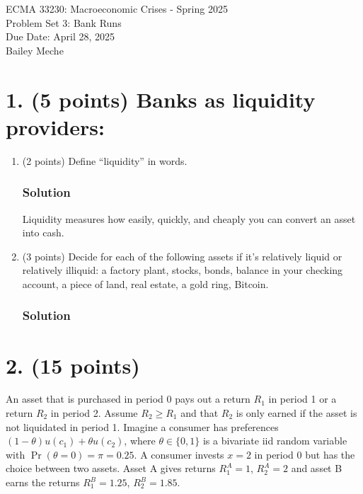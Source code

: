 \documentclass[12pt]{article}
\begin{document}
	\begin{center}
		ECMA 33230: Macroeconomic Crises - Spring 2025\\
        Problem Set 3: Bank Runs \\
		Due Date: April 28, 2025 \\
        Bailey Meche
	\end{center}

\section*{1. (5 points) Banks as liquidity providers:}

\begin{enumerate}[label=(\alph*)]
    \item (2 points) Define ``liquidity'' in words.
    \subsubsection*{Solution}

    Liquidity measures how easily, quickly, and cheaply you can convert an asset into cash. 

    \item (3 points) Decide for each of the following assets if it’s relatively liquid or relatively illiquid: a factory plant, stocks, bonds, balance in your checking account, a piece of land, real estate, a gold ring, Bitcoin.
     \subsubsection*{Solution}

     
\end{enumerate}

\section*{2. (15 points)}

An asset that is purchased in period 0 pays out a return $R_1$ in period 1 or a return $R_2$ in period 2. Assume $R_2 \geq R_1$ and that $R_2$ is only earned if the asset is not liquidated in period 1. Imagine a consumer has preferences $(1 - \theta)u(c_1) + \theta u(c_2)$, where $\theta \in \{0, 1\}$ 
is a bivariate iid random variable with $\Pr(\theta = 0) = \pi = 0.25$. A consumer invests $x = 2$ in period 0 but has the choice between two assets. Asset A gives returns $R_{1}^A = 1$, $R_{2}^A = 2$ and asset B earns the returns $R_{1}^B = 1.25$, $R_{2}^B = 1.85$.
\end{document}
